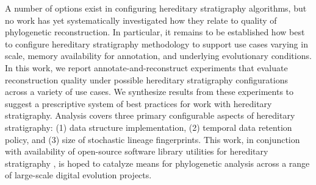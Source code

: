 A number of options exist in configuring hereditary stratigraphy algorithms, but no work has yet systematically investigated how they relate to quality of phylogenetic reconstruction.
In particular, it remains to be established how best to configure hereditary stratigraphy methodology to support use cases varying in scale, memory availability for annotation, and underlying evolutionary conditions.
In this work, we report annotate-and-reconstruct experiments that evaluate reconstruction quality under possible hereditary stratigraphy configurations across a variety of use cases.
We synthesize results from these experiments to suggest a prescriptive system of best practices for work with hereditary stratigraphy.
Analysis covers three primary configurable aspects of hereditary stratigraphy: (1) data structure implementation, (2) temporal data retention policy, and (3) size of stochastic lineage fingerprints.
This work, in conjunction with availability of open-source software library utilities for hereditary stratigraphy \citep{moreno2022hstrat}, is hoped to catalyze means for phylogenetic analysis across a range of large-scale digital evolution projects.




